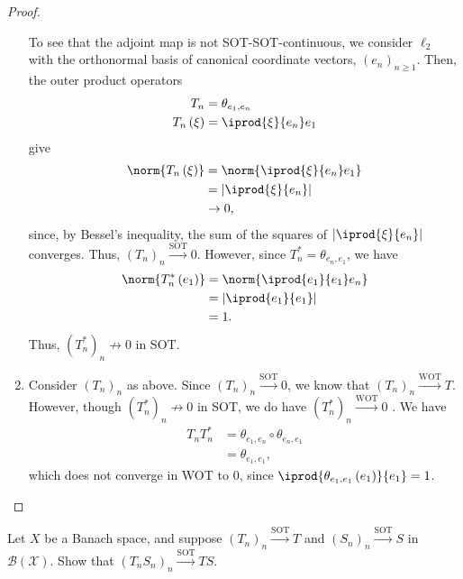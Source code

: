 \documentclass[10pt]{mypackage}
\begin{document}
\begin{proof}
\begin{enumerate}[(1)]
      To see that the adjoint map is not SOT-SOT-continuous, we consider $\ell_2$ with the orthonormal basis of canonical coordinate vectors, $\left(e_n\right)_{n\geq 1}$. Then, the outer product operators
      \begin{align*}
        T_n &= \theta_{e_1,e_n}\\
        T_n\left(\xi\right) &= \iprod{\xi}{e_n}e_1
      \end{align*}
      give
      \begin{align*}
        \norm{T_n\left(\xi\right)} &= \norm{ \iprod{\xi}{e_n}e_1 }\\
                                   &= \left\vert \iprod{\xi}{e_n} \right\vert\\
                                   &\rightarrow 0,
      \end{align*}
      since, by Bessel's inequality, the sum of the squares of $\left\vert \iprod{\xi}{e_n} \right\vert$ converges. Thus, $\left(T_n\right)_n\xrightarrow{\text{SOT}} 0$. However, since $T^{\ast}_{n} = \theta_{e_n,e_1}$, we have
      \begin{align*}
        \norm{T^{\ast}_{n}\left(e_1\right)} &= \norm{ \iprod{e_1}{e_1}e_n }\\
                                            &= \left\vert \iprod{e_1}{e_1} \right\vert\\
                                            &= 1.
      \end{align*}
      Thus, $\left(T_n^{\ast}\right)_{n}\not\rightarrow 0$ in SOT.
    \item Consider $\left(T_n\right)_n$ as above. Since $\left(T_n\right)_n\xrightarrow{\text{SOT}} 0$, we know that $\left(T_n\right)_n\xrightarrow{\text{WOT}}T$. However, though $\left(T_n^{\ast}\right)_n\not\rightarrow0$ in SOT, we do have $\left(T_n^{\ast}\right)_n\xrightarrow{\text{WOT}}0$ . We have
      \begin{align*}
        T_nT_n^{\ast} &= \theta_{e_1,e_n}\circ \theta_{e_n,e_1}\\
                      &= \theta_{e_1,e_1},
      \end{align*}
      which does not converge in WOT to $0$, since $ \iprod{\theta_{e_1,e_1}\left(e_1\right)}{e_1} = 1 $.
  \end{enumerate}
\end{proof}
\begin{exercise}
  Let $X$ be a Banach space, and suppose $\left(T_n\right)_n\xrightarrow{\text{SOT}}T$ and $\left(S_n\right)_n\xrightarrow{\text{SOT}}S$ in $\mathcal{B}\left(\mathcal{X}\right)$. Show that $\left(T_nS_n\right)_n\xrightarrow{\text{SOT}}TS$.
\end{exercise}
\end{document}
